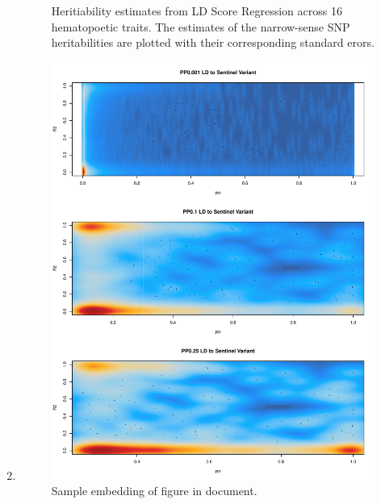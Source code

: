 \documentclass{article}\usepackage[]{graphicx}\usepackage[]{color}
\newenvironment{knitrout}{}{} %
\begin{document}
\begin{enumerate}[label=(\Alph*)]
\begin{knitrout}
\begin{figure}[H]
{}

\caption[Heritiability estimates from LD Score Regression across 16 hematopoetic traits]{Heritiability estimates from LD Score Regression across 16 hematopoetic traits. The estimates of the narrow-sense SNP heritabilities are plotted with their corresponding standard erors.}\label{fig:heritabilityPlots}
\end{figure}


\end{knitrout}
\item

\begin{figure}[H]
\centering
\includegraphics[width=\linewidth]{staticFigures/LDtoSentinel_PPcomparison.pdf}
\caption{Sample embedding of figure in document.}
\end{figure} 

\end{enumerate}
\end{document}
